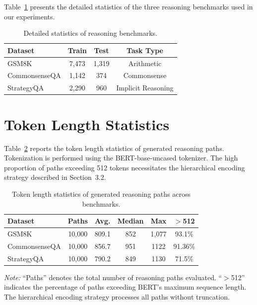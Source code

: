 \documentclass[a4paper,fleqn]{cas-dc}
\begin{document}
Table~\ref{tab:dataset-details} presents the detailed statistics of the three reasoning benchmarks used in our experiments.

\begin{table}[h]
\centering
\caption{Detailed statistics of reasoning benchmarks.}
\label{tab:dataset-details}
\begin{tabular}{lccc}
\toprule
\textbf{Dataset} & \textbf{Train} & \textbf{Test} & \textbf{Task Type} \\
\midrule
GSM8K & 7,473 & 1,319 & Arithmetic \\
CommonsenseQA & 1,142 & 374 & Commonsense \\
StrategyQA & 2,290 & 960 & Implicit Reasoning \\
\bottomrule
\end{tabular}
\end{table}

\section{Token Length Statistics}
\label{sec:token-stats}

Table~\ref{tab:token-length} reports the token length statistics of generated reasoning paths. Tokenization is performed using the BERT-base-uncased tokenizer. The high proportion of paths exceeding 512 tokens necessitates the hierarchical encoding strategy described in Section~3.2.

\begin{table}[h]
\centering
\caption{Token length statistics of generated reasoning paths across benchmarks.}
\label{tab:token-length}
\begin{tabular}{lccccc}
\toprule
\textbf{Dataset} & \textbf{Paths} & \textbf{Avg.} & \textbf{Median} & \textbf{Max} & \textbf{$>$512} \\
\midrule
GSM8K & 10,000 & 809.1 & 852 & 1,077 & 93.1\% \\
CommonsenseQA & 10,000 & 856.7 & 951 & 1122 & 91.36\% \\
StrategyQA & 10,000 & 790.2 & 849 & 1130 & 71.5\% \\
\bottomrule
\end{tabular}
\end{table}

\noindent\textit{Note:} ``Paths'' denotes the total number of reasoning paths evaluated. ``$>$512'' indicates the percentage of paths exceeding BERT's maximum sequence length. The hierarchical encoding strategy processes all paths without truncation.
\end{document}
